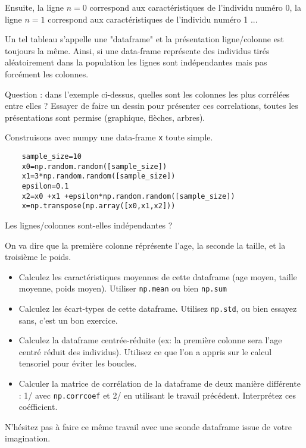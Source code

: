 \documentclass{article}
\begin{document}
Ensuite, la ligne $n=0$ correspond aux caractéristiques de l'individu numéro 0, la ligne $n=1$ correspond aux caractéristiques de l'individu numéro 1 ... 


Un tel tableau s'appelle  une "dataframe" et  la présentation ligne/colonne est toujours la même.  Ainsi, si une data-frame représente des individus tirés aléatoirement dans la population les lignes sont indépendantes mais pas forcément les colonnes.  

Question : dans l'exemple ci-dessus, quelles sont les colonnes les plus corrélées entre elles ? Essayer de faire un dessin pour présenter ces correlations, toutes les présentations sont permise (graphique, flèches, arbres). 


Construisons avec numpy une data-frame \verb$x$ toute simple.  
\begin{verbatim}
    sample_size=10
    x0=np.random.random([sample_size])
    x1=3*np.random.random([sample_size])
    epsilon=0.1
    x2=x0 +x1 +epsilon*np.random.random([sample_size])
    x=np.transpose(np.array([x0,x1,x2]))
\end{verbatim}
Les lignes/colonnes sont-elles indépendantes ?

On va dire que la première colonne réprésente l'age, la seconde la taille, et la troisième le poids. 
\begin{itemize}
\item Calculez les caractéristiques moyennes de cette dataframe (age moyen, taille moyenne, poids moyen). Utiliser \verb$np.mean$ ou bien \verb$np.sum$
\item   Calculez les écart-types de cette dataframe. Utilisez \verb$np.std$, ou bien essayez sans, c'est un bon exercice. 
\item Calculez la dataframe centrée-réduite (ex: la première colonne sera l'age centré réduit des individus). Utilisez ce que l'on a appris sur le calcul tensoriel pour éviter les boucles.  
\item Calculer la matrice de corrélation de la dataframe de deux manière différente : 1/ avec \verb$np.corrcoef$ et 2/ en utilisant le travail précédent.   Interprétez ces coéfficient. 
\end{itemize}


N'hésitez pas à faire ce même travail avec une sconde dataframe issue de votre imagination. 
\end{document}
